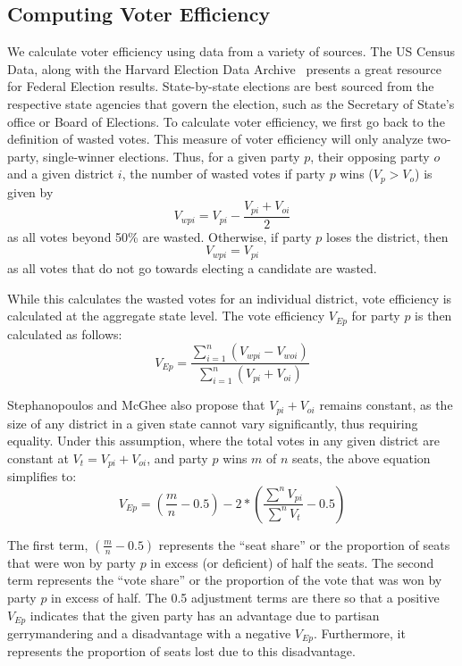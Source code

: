 \documentclass[12pt]{article}
\begin{document}
  \subsection {Computing Voter Efficiency}
  We calculate voter efficiency using data from a variety of sources.  The US Census Data, along with the Harvard Election Data Archive~\cite{heda} presents a great resource for Federal Election results.  State-by-state elections are best sourced from the respective state agencies that govern the election, such as the Secretary of State's office or Board of Elections.  To calculate voter efficiency, we first go back to the definition of wasted votes.  This measure of voter efficiency will only analyze two-party, single-winner elections.  Thus, for a given party $p$, their opposing party $o$ and a given district $i$, the number of wasted votes  if party $p$ wins ($V_{p} > V_{o}$)  is given by
    \[ V_{wpi} = V_{pi} - \frac{V_{pi}+V_{oi}}{2}\]
  as all votes beyond 50\% are wasted. Otherwise, if party $p$ loses the district, then
    \[V_{wpi} = V_{pi}\]
  as all votes that do not go towards electing a candidate are wasted.

    While this calculates the wasted votes for an individual district, vote efficiency is calculated at the aggregate state level.  The vote efficiency $V_{Ep}$ for party $p$ is then calculated as follows:
     \[V_{Ep} = \frac{\sum_{i=1}^{n}\left(V_{wpi}-V_{woi}\right)}{\sum_{i=1}^{n}\left(V_{pi}+V_{oi}\right)}\]

     Stephanopoulos and McGhee also propose that $V_{pi}+V_{oi}$ remains constant, as the size of any district in a given state cannot vary significantly, thus requiring equality.  Under this assumption, where the total votes in any given district are constant at $V_{t} = V_{pi}+V_{oi}$, and party $p$ wins $m$ of $n$ seats, the above equation simplifies to:
     \[V_{Ep} = \left(\frac{m}{n}-0.5\right) - 2*\left(\frac{\sum^{n}V_{pi}}{\sum^n{V_t}}-0.5\right)\]

  The first term, $\left(\frac{m}{n}-0.5\right)$ represents the ``seat share'' or the proportion of seats that were won by party $p$ in excess (or deficient) of half the seats.  The second term represents the ``vote share'' or the proportion of the vote that was won by party $p$ in excess of half. The 0.5 adjustment terms are there so that a positive $V_{Ep}$ indicates that the given party has an advantage due to partisan gerrymandering and a disadvantage with a negative $V_{Ep}$.  Furthermore, it represents the proportion of seats lost due to this disadvantage.
\end{document}
